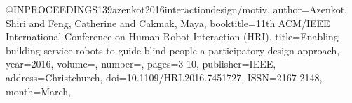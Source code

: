 @INPROCEEDINGS{139azenkot2016interactiondesign/motiv,
author={Azenkot, Shiri and Feng, Catherine and Cakmak, Maya},
booktitle={11th ACM/IEEE International Conference on Human-Robot Interaction (HRI)}, 
title={Enabling building service robots to guide blind people a participatory design approach}, 
year={2016},
volume={},
number={},
pages={3-10},
publisher={IEEE},
address={Christchurch},
doi={10.1109/HRI.2016.7451727},
ISSN={2167-2148},
month={March},}